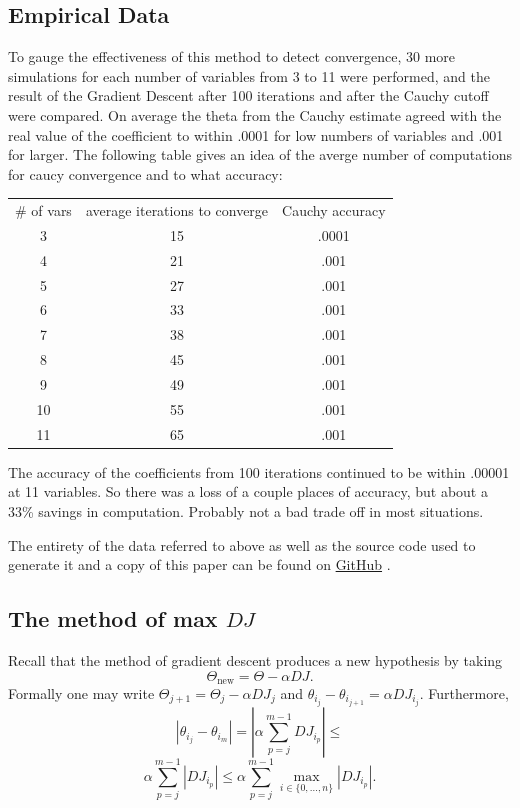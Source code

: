 \documentclass[11pt]{article} %
\begin{document}
\subsection{Empirical Data}
To gauge the effectiveness of this method to detect convergence, 30 more simulations for each number of variables from 3 to 11 were performed, and the result of the Gradient Descent after 100 iterations and after the Cauchy cutoff were compared. On average the theta from the Cauchy estimate agreed with the real value of the coefficient to within .0001 for low numbers of variables and .001 for larger.  The following table gives an idea of the averge number of computations for caucy convergence and to what accuracy: 

\begin{tabular} {ccc}
\# of vars & average iterations to converge & Cauchy accuracy\\
3 &  15 & .0001 \\
4 &  21  & .001 \\
5 &  27 & .001 \\
6 &  33 & .001 \\
7 &  38 & .001 \\
8 & 45 & .001 \\
9 & 49 & .001\\
10 & 55 & .001\\
11 & 65 & .001

\end{tabular} 

The accuracy of the coefficients from 100 iterations continued to be within .00001 at 11 variables.  So there was a loss of a couple places of accuracy, but about a 33\% savings in computation.  Probably not a bad trade off in most situations.  

The entirety of the data referred to above as well as the source code used to generate it and a copy of this paper can be found on \href{ https://github.com/likes2addfunctions/CodeSamples/tree/master/GDCauchyMethod }{ GitHub} .

\subsection{The method of max $DJ$}
Recall that the method of gradient descent produces a new hypothesis by taking 
$$\Theta_{\mbox{new}} = \Theta - \alpha DJ.$$
Formally one may write 
$\Theta_{j+1} = \Theta_{j} - \alpha DJ_{j}$ 
and $\theta_{i_{j}} - \theta_{i_{j+1}} = \alpha DJ_{i_{j}}$. 
 Furthermore,
$$|\theta_{i_{j}} - \theta_{i_{m}}| = | \alpha \sum_{p=j}^{m-1}  DJ_{i_{p}}| \leq$$
$$\alpha \sum_{p=j}^{m-1}  |DJ_{i_{p}}| \leq \alpha \sum_{p=j}^{m-1} \max_{i \in \{0, \dots , n\}} |DJ_{i_{p}}|. $$
\end{document}
